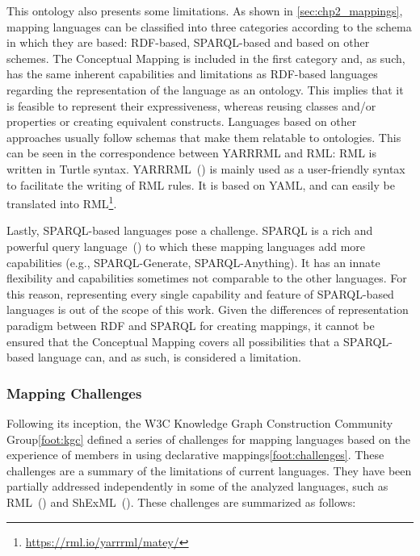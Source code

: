 This ontology also presents some limitations. As shown in \cref{sec:chp2_mappings}, mapping languages can be classified into three categories according to the schema in which they are based: RDF-based, SPARQL-based and based on other schemes. The Conceptual Mapping is included in the first category and, as such, has the same inherent capabilities and limitations as RDF-based languages regarding the representation of the language as an ontology. This implies that it is feasible to represent their expressiveness, whereas reusing classes and/or properties or creating equivalent constructs. Languages based on other approaches usually follow schemas that make them relatable to ontologies. This can be seen in the correspondence between YARRRML and RML: RML is written in Turtle syntax. YARRRML~(\cite{Heyvaert2018yarrrml}) is mainly used as a user-friendly syntax to facilitate the writing of RML rules. It is based on YAML, and can easily be translated into RML\footnote{\url{https://rml.io/yarrrml/matey/}}. 

Lastly, SPARQL-based languages pose a challenge. SPARQL is a rich and powerful query language~(\cite{perez2009semantics}) to which these mapping languages add more capabilities (e.g., SPARQL-Generate, SPARQL-Anything). It has an innate flexibility and capabilities sometimes not comparable to the other languages. For this reason, representing every single capability and feature of SPARQL-based languages is out of the scope of this work. Given the differences of representation paradigm between RDF and SPARQL for creating mappings, it cannot be ensured that the Conceptual Mapping covers all possibilities that a SPARQL-based language can, and as such, is considered a limitation.


\subsubsection{Mapping Challenges}
\label{sec:chp4_mapping_challenges}

Following its inception, the W3C Knowledge Graph Construction Community Group\cref{foot:kgc} defined a series of challenges for mapping languages based on the experience of members in using declarative mappings\cref{foot:challenges}. These challenges are a summary of the limitations of current languages. They have been partially addressed independently in some of the analyzed languages, such as RML~(\cite{delva2021rml-fields}) and ShExML~(\cite{garcia2021shexml-challenges}). These challenges are summarized as follows:

